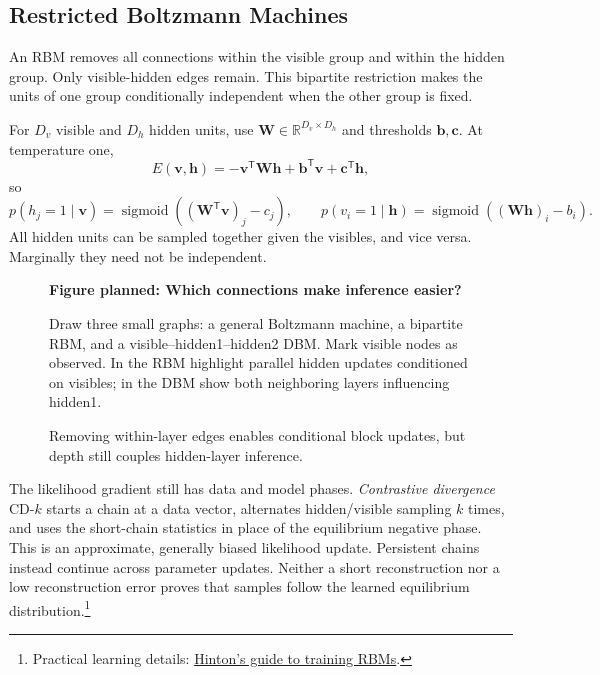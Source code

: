 \documentclass[11pt, oneside]{book}
\newcommand{\R}{\mathbb{R}}
\newcommand{\T}{^{\mathsf{T}}}           %
\let\originalsubsection\subsection
\renewcommand{\subsection}{\Needspace{6\baselineskip}\originalsubsection}
\newcommand{\figureplaceholder}[5]{%
\begin{figure}[htbp]
\centering
\begin{tcolorbox}[unbreakable,width=\linewidth,height=#1,colback=accent!3,
  colframe=accent!30,boxrule=0.5pt,arc=2.5mm,sharp corners=all,
  valign=center,halign=center,fontupper=\small]
{\bfseries\color{accent}Figure planned: #2}\par\medskip
{\color{gray!75!black}#3}
\end{tcolorbox}
\caption{#4}\label{#5}
\end{figure}}
\begin{document}
\subsection{Restricted Boltzmann Machines}\label{sec:source-10-3-2}
An RBM removes all connections within the visible group and within the hidden group. Only visible-hidden edges remain. This bipartite restriction makes the units of one group conditionally independent when the other group is fixed.

For $D_v$ visible and $D_h$ hidden units, use $\mathbf{W}\in\R^{D_v\times D_h}$ and thresholds $\mathbf{b},\mathbf{c}$. At temperature one,
\[
 E(\mathbf{v},\mathbf{h})=-\mathbf{v}\T\mathbf{W}\mathbf{h}
 +\mathbf{b}\T\mathbf{v}+\mathbf{c}\T\mathbf{h},
\]
so
\[
 p(h_j=1\mid\mathbf{v})=\operatorname{sigmoid}((\mathbf{W}\T\mathbf{v})_j-c_j),
 \qquad
 p(v_i=1\mid\mathbf{h})=\operatorname{sigmoid}((\mathbf{W}\mathbf{h})_i-b_i).
\]
All hidden units can be sampled together given the visibles, and vice versa. Marginally they need not be independent.

\figureplaceholder{3.0cm}{Which connections make inference easier?}{Draw three small graphs: a general Boltzmann machine, a bipartite RBM, and a visible--hidden1--hidden2 DBM. Mark visible nodes as observed. In the RBM highlight parallel hidden updates conditioned on visibles; in the DBM show both neighboring layers influencing hidden1.}{Removing within-layer edges enables conditional block updates, but depth still couples hidden-layer inference.}{fig:boltzmann-graphs}

The likelihood gradient still has data and model phases. \emph{Contrastive divergence} CD-$k$ starts a chain at a data vector, alternates hidden/visible sampling $k$ times, and uses the short-chain statistics in place of the equilibrium negative phase. This is an approximate, generally biased likelihood update. Persistent chains instead continue across parameter updates. Neither a short reconstruction nor a low reconstruction error proves that samples follow the learned equilibrium distribution.\footnote{Practical learning details: \href{https://www.cs.toronto.edu/~hinton/absps/guideTR.pdf}{Hinton's guide to training RBMs}.}
\end{document}
